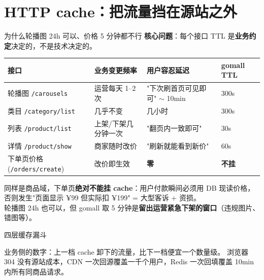 \documentclass[aspectratio=169,11pt]{beamer}
\begin{document}
\section{HTTP cache：把流量挡在源站之外}

\begin{frame}[shrink]{为什么轮播图 24h 可以、价格 5 分钟都不行}
\textbf{核心问题}：每个接口 TTL 是\textbf{业务约定}决定的，不是技术决定的。
\vspace{1mm}
\begin{tabular}{@{}llll@{}}
\toprule
接口 & 业务变更频率 & 用户容忍延迟 & gomall TTL \\
\midrule
轮播图 \texttt{/carousels}      & 运营每天 1--2 次   & "下次刷首页可见即可" $\sim$ 10min  & 300s \\
类目 \texttt{/category/list}    & 几乎不变           & 几小时              & 300s \\
列表 \texttt{/product/list}     & 上架/下架几分钟一次 & "翻页内一致即可"   & 30s  \\
详情 \texttt{/product/show}     & 商家随时改价        & "刷新就能看到新价" & 60s  \\
下单页价格 (\texttt{/orders/create}) & 改价即生效         & \textbf{零}        & \textbf{不挂} \\
\bottomrule
\end{tabular}
\vspace{2mm}
\small 同样是商品域，下单页\textbf{绝对不能挂 cache}：用户付款瞬间必须用 DB 现读价格，否则发生"页面显示 ¥99 但实际扣 ¥199" = 大型客诉 + 资损。\\
轮播图 24h 也可以，但 gomall 取 5 分钟是\textbf{留出运营紧急下架的窗口}（违规图片、错图等）。
\end{frame}

\begin{frame}[shrink]{四层缓存漏斗}
\vspace{2mm}
\small 业务侧的数字：上一档 cache 卸下的流量，比下一档便宜一个数量级。
浏览器 304 没有源站成本，CDN 一次回源覆盖一千个用户，Redis 一次回填覆盖 10min 内所有同商品请求。
\end{frame}
\end{document}
